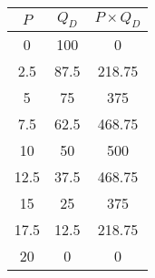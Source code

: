 \begin{frame}
\begin{columns}
\begin{column}{0.6\textwidth}
\begin{center}
			\end{center}
		\end{column}
		\begin{column}{0.375\textwidth}
			{\centering
			\footnotesize
			\begin{tabular}{ccc}
				$P$ & $Q_D$ & $P\times Q_D$\\\hline
				0 & 100 & 0 \\
				2.5 & 87.5 & 218.75 \\
				5 & 75 & 375 \\
				7.5 & 62.5 & 468.75 \\
				10 & 50 & 500 \\
				12.5 & 37.5 & 468.75 \\
				15 & 25 & 375 \\
				17.5 & 12.5 & 218.75 \\
				20 & 0 & 0
			\end{tabular}
		}
		\end{column}
	\end{columns}
\end{frame}

